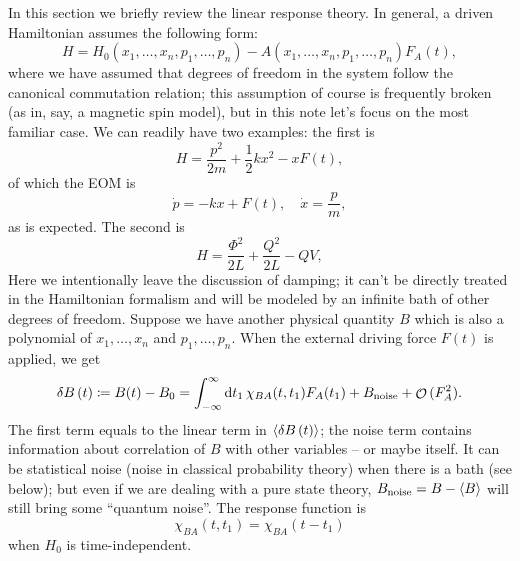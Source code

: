 \documentclass[hyperref, a4paper]{article}
\DeclareMathOperator{\bigO}{\mathcal{O}}
\begin{document}
In this section we briefly review the linear response theory.
In general, a driven Hamiltonian assumes the following form: 
\begin{equation}
    H = H_0(x_1, \ldots, x_n, p_1, \ldots, p_n) - A(x_1, \ldots, x_n, p_1, \ldots, p_n) F_A(t),
\end{equation}
where we have assumed that degrees of freedom in the system 
follow the canonical commutation relation;
this assumption of course is frequently broken
(as in, say, a magnetic spin model),
but in this note let's focus on the most familiar case. 
We can readily have two examples: 
the first is 
\begin{equation}
    H = \frac{p^2}{2m} + \frac{1}{2} k x^2 - x F(t),
\end{equation}
of which the EOM is 
\begin{equation}
    \dot{p} = - kx + F(t), \quad 
    \dot{x} = \frac{p}{m} ,
\end{equation}
as is expected.
The second is 
\begin{equation}
    H = \frac{\Phi^2}{2L} + \frac{Q^2}{2L} - Q V,
\end{equation}
Here we intentionally leave the discussion of damping;
it can't be directly treated in the Hamiltonian formalism 
and will be modeled by an infinite bath of other degrees of freedom.
Suppose we have another physical quantity $B$ 
which is also a polynomial of $x_1, \ldots, x_n$
and $p_1, \ldots, p_n$.
When the external driving force $F(t)$ is applied, 
we get 
\begin{equation}
    \var{B}(t) \coloneqq B(t) - B_0 
    = \int_{-\infty}^\infty \dd{t_1} \chi_{BA}(t, t_1) F_A(t_1) 
    + B_{\text{noise}} + \bigO{(F_A^2)}.
\end{equation}
The first term equals to the linear term in $\expval{\var{B}(t)}$;
the noise term contains information about correlation of $B$
with other variables -- or maybe itself.
It can be statistical noise (noise in classical probability theory)
when there is a bath (see below);
but even if we are dealing with a pure state theory,
$B_{\text{noise}} = B - \expval{B}$ will still bring some ``quantum noise''.
The response function is 
\begin{equation}
    \chi_{BA}(t, t_1) = \chi_{BA}(t - t_1)
\end{equation}
when $H_0$ is time-independent.
\end{document}
